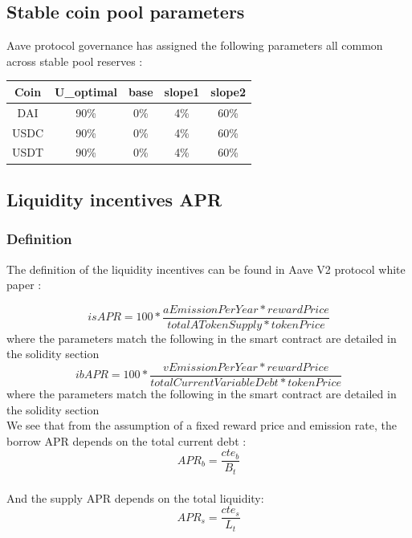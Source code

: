 \documentclass[conference]{IEEEtran}
\begin{document}
\subsection{Stable coin pool parameters}
Aave protocol governance has assigned the following parameters all common across stable pool reserves :
\begin{center}
\begin{tabular}{||c c c c c||} 
 \hline
 Coin & U_{optimal} & base & slope1 & slope2 \\ [0.5ex] 
 \hline\hline
 DAI & 90\% & 0\% & 4\% & 60\% \\ 
 \hline
 USDC &  90\% & 0\% & 4\% & 60\% \\
 \hline
 USDT &  90\% & 0\% & 4\% & 60\%\\
 \end{tabular}
\end{center}

\subsection{Liquidity incentives APR}
\subsubsection{Definition}
The definition of the liquidity incentives can be found in Aave V2 protocol white paper :

\begin{equation}\label{eq:isAPR}
 isAPR=100 *\frac{ aEmissionPerYear* rewardPrice}{totalATokenSupply * tokenPrice} 
\end{equation}
where the parameters match the following in the smart contract are detailed in the solidity section\\

\begin{equation}\label{eq:ibAPR}
 ibAPR=100 *\frac{ vEmissionPerYear* rewardPrice}{totalCurrentVariableDebt * tokenPrice} 
\end{equation}
where the parameters match the following in the smart contract are detailed in the solidity section\\

We see that from the assumption of a fixed reward price and emission rate, the borrow APR depends on the total current debt :\\
\begin{equation}
APR_b = \frac{cte_b}{B_t}
\end{equation}\\
And the supply APR depends on the total liquidity:\\
\begin{equation}
APR_s = \frac{cte_s}{L_t}
\end{equation}
\end{document}
